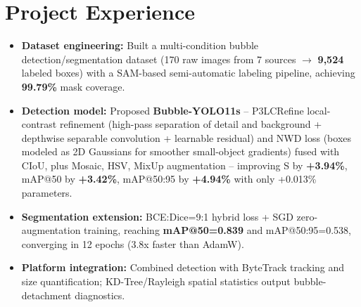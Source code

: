 \documentclass[10pt]{resume}
\begin{document}
\section{Project Experience}
\begin{itemize}[parsep=0.1ex, leftmargin=1.2pc]
  \item \textbf{Dataset engineering:} Built a multi-condition bubble detection/segmentation dataset (170 raw images from 7 sources $\to$ \textbf{9,524} labeled boxes) with a SAM-based semi-automatic labeling pipeline, achieving \textbf{99.79\%} mask coverage.
  \item \textbf{Detection model:} Proposed \textbf{Bubble-YOLO11s} -- P3LCRefine local-contrast refinement (high-pass separation of detail and background + depthwise separable convolution + learnable residual) and NWD loss (boxes modeled as 2D Gaussians for smoother small-object gradients) fused with CIoU, plus Mosaic, HSV, MixUp augmentation -- improving S by \textbf{+3.94\%}, mAP@50 by \textbf{+3.42\%}, mAP@50:95 by \textbf{+4.94\%} with only +0.013\% parameters.
  \item \textbf{Segmentation extension:} BCE:Dice=9:1 hybrid loss + SGD zero-augmentation training, reaching \textbf{mAP@50=0.839} and mAP@50:95=0.538, converging in 12 epochs (3.8x faster than AdamW).
  \item \textbf{Platform integration:} Combined detection with ByteTrack tracking and size quantification; KD-Tree/Rayleigh spatial statistics output bubble-detachment diagnostics.
\end{itemize}
\end{document}
